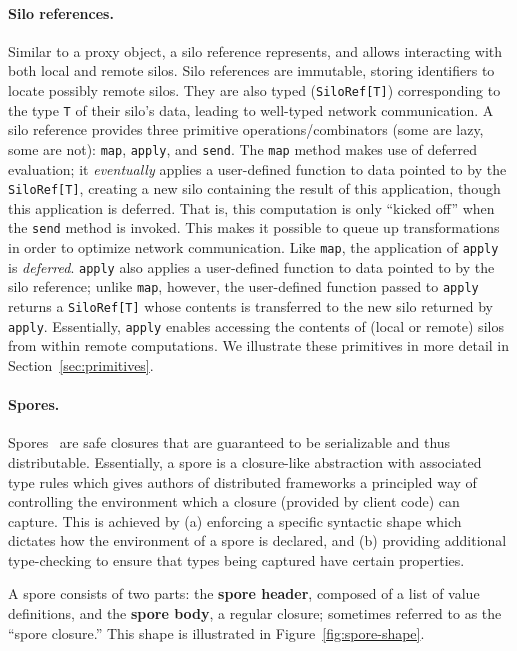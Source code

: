 \documentclass{jfp1}
\begin{document}
\paragraph{Silo references.}

Similar to a proxy object, a silo reference represents, and allows interacting
with both local and remote silos. Silo references are immutable, storing
identifiers to locate possibly remote silos. They are also typed
(\verb|SiloRef[T]|) corresponding to the type \verb|T| of their silo's data,
leading to well-typed network communication. A silo reference provides three
primitive operations/combinators (some are lazy, some are not): \verb|map|,
\verb|apply|, and \verb|send|. The \verb|map| method makes use of deferred
evaluation; it {\em eventually} applies a user-defined function to data pointed
to by the \verb|SiloRef[T]|, creating a new silo containing the result of this
application, though this application is deferred. That is, this computation is only ``kicked
off'' when the \verb|send| method is invoked. This makes it possible to queue up
transformations in order to optimize network communication. Like \verb|map|, the
application of \verb|apply| is {\em deferred}. \verb|apply| also applies a
user-defined function to data pointed to by the silo reference; unlike
\verb|map|, however, the user-defined function passed to \verb|apply| returns
a \verb|SiloRef[T]| whose contents is transferred to the new silo returned by
\verb|apply|. Essentially, \verb|apply| enables accessing the contents of
(local or remote) silos from within remote computations. We illustrate these
primitives in more detail in Section~\ref{sec:primitives}.

\paragraph{Spores.}

Spores~\cite{Spores} are safe closures that are guaranteed to be serializable
and thus distributable. Essentially, a spore is a closure-like abstraction with associated type rules
which gives authors of distributed frameworks a principled way of controlling
the environment which a closure (provided by client code) can capture. This is
achieved by (a) enforcing a specific syntactic shape which dictates how the
environment of a spore is declared, and (b) providing additional type-checking
to ensure that types being captured have certain properties.

\vspace{3mm}
\noindent A spore consists of two parts: the \textbf{spore header}, composed of
a list of value definitions, and the \textbf{spore body}, a regular closure;
sometimes referred to as the ``spore closure.'' This shape is illustrated in
Figure~\ref{fig:spore-shape}.
\end{document}
